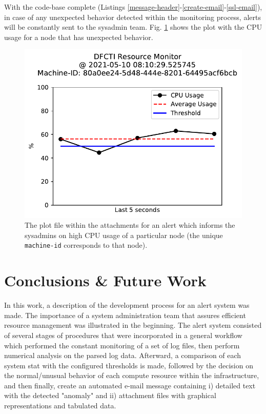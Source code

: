 \documentclass[conference]{IEEEtran}
\begin{document}
With the code-base complete (Listings \ref{message-header}-\ref{create-email}-\ref{ssl-email}), in case of any unexpected behavior detected within the monitoring process, alerts will be constantly sent to the sysadmin team. Fig. \ref{cpu-ss} shows the plot with the CPU usage for a node that has unexpected behavior.


\begin{figure}[htbp]
    \centering
    \includegraphics[scale=0.6]{figs/cpu_usage.pdf}
    \caption{The plot file within the attachments for an alert which informs the sysadmins on high CPU usage of a particular node (the unique \texttt{machine-id} corresponds to that node).}
    \label{cpu-ss}
\end{figure}

\section{Conclusions \& Future Work}
\label{section-conclusions}

In this work, a description of the development process for an alert system was made. The importance of a system administration team that assures efficient resource management was illustrated in the beginning. The alert system consisted of several stages of procedures that were incorporated in a general workflow which performed the constant monitoring of a set of log files, then perform numerical analysis on the parsed log data. Afterward, a comparison of each system stat with the configured thresholds is made, followed by the decision on the normal/unusual behavior of each compute resource within the infrastructure, and then finally, create an automated e-mail message containing i) detailed text with the detected "anomaly" and ii) attachment files with graphical representations and tabulated data.
\end{document}
